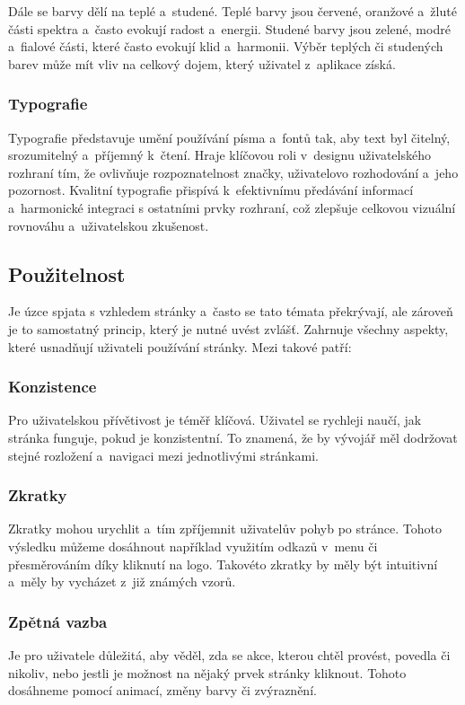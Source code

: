Dále se barvy dělí na teplé a~studené. Teplé barvy jsou červené, oranžové a~žluté části spektra a~často evokují radost a~energii. Studené barvy jsou zelené, modré a~fialové části, které často evokují klid a~harmonii. Výběr teplých či studených barev může mít vliv na celkový dojem, který uživatel z~aplikace získá. \cite{color_theory_design} 

\subsubsection{Typografie}
Typografie představuje umění používání písma a~fontů tak, aby text byl čitelný, srozumitelný a~příjemný k~čtení. Hraje klíčovou roli v~designu uživatelského rozhraní tím, že ovlivňuje rozpoznatelnost značky, uživatelovo rozhodování a~jeho pozornost. Kvalitní typografie přispívá k~efektivnímu předávání informací a~harmonické integraci s ostatními prvky rozhraní, což zlepšuje celkovou vizuální rovnováhu a~uživatelskou zkušenost. \cite{typography}

\subsection{Použitelnost}
Je úzce spjata s vzhledem stránky a~často se tato témata překrývají, ale zároveň je to samostatný princip, který je nutné uvést zvlášť. Zahrnuje všechny aspekty, které usnadňují uživateli používání stránky. Mezi takové patří: \cite{principles_of_ui_design}

\subsubsection*{Konzistence}
Pro uživatelskou přívětivost je téměř klíčová. Uživatel se rychleji naučí, jak stránka funguje, pokud je konzistentní. To znamená, že by vývojář měl dodržovat stejné rozložení a~navigaci mezi jednotlivými stránkami.

\subsubsection*{Zkratky}
Zkratky mohou urychlit a~tím zpříjemnit uživatelův pohyb po stránce. Tohoto výsledku můžeme dosáhnout například využitím odkazů v~menu či přesměrováním díky kliknutí na logo. Takovéto zkratky by měly být intuitivní a~měly by vycházet z~již známých vzorů.

\subsubsection*{Zpětná vazba}
Je pro uživatele důležitá, aby věděl, zda se akce, kterou chtěl provést, povedla či nikoliv, nebo jestli je možnost na nějaký prvek stránky kliknout. Tohoto dosáhneme pomocí animací, změny barvy či zvýraznění.

